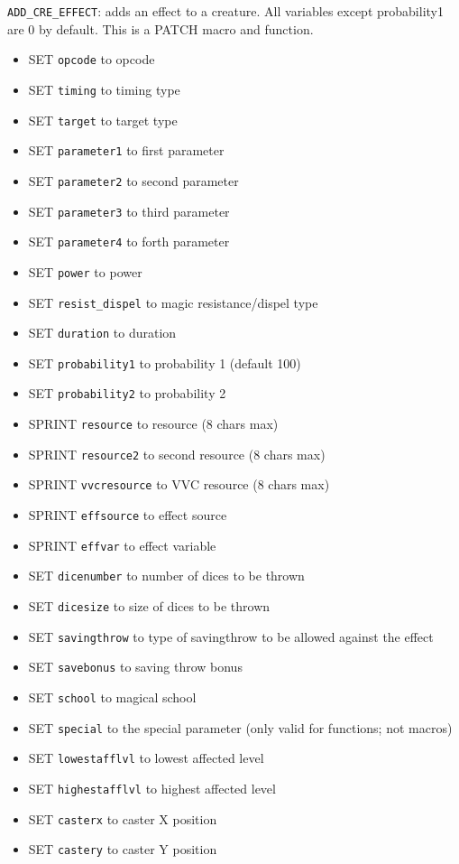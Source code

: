 \documentclass{article}
\begin{document}
\verb+ADD_CRE_EFFECT+: adds an effect to a creature. All variables except probability1 are 0 by default.
This is a PATCH macro and function.
\begin{itemize}
\item SET \verb+opcode+ to opcode
\item SET \verb+timing+ to timing type
\item SET \verb+target+ to target type
\item SET \verb+parameter1+ to first parameter
\item SET \verb+parameter2+ to second parameter
\item SET \verb+parameter3+ to third parameter
\item SET \verb+parameter4+ to forth parameter
\item SET \verb+power+ to power
\item SET \verb+resist_dispel+ to magic resistance/dispel type
\item SET \verb+duration+ to duration
\item SET \verb+probability1+ to probability 1 (default 100)
\item SET \verb+probability2+ to probability 2
\item SPRINT \verb+resource+ to resource (8 chars max)
\item SPRINT \verb+resource2+ to second resource (8 chars max)
\item SPRINT \verb+vvcresource+ to VVC resource (8 chars max)
\item SPRINT \verb+effsource+ to effect source
\item SPRINT \verb+effvar+ to effect variable
\item SET \verb+dicenumber+ to number of dices to be thrown
\item SET \verb+dicesize+ to size of dices to be thrown
\item SET \verb+savingthrow+ to type of savingthrow to be allowed against the effect
\item SET \verb+savebonus+ to saving throw bonus
\item SET \verb+school+ to magical school
\item SET \verb+special+ to the special parameter (only valid for functions; not macros)
\item SET \verb+lowestafflvl+ to lowest affected level
\item SET \verb+highestafflvl+ to highest affected level
\item SET \verb+casterx+ to caster X position
\item SET \verb+castery+ to caster Y position

\end{itemize}
\end{document}
